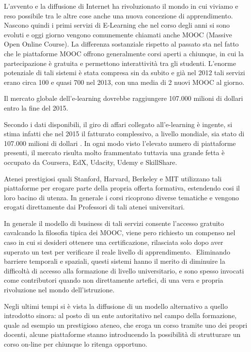 L'avvento e la diffusione di Internet ha rivoluzionato il mondo in cui viviamo e reso possibile tra le altre cose anche una nuova concezione di apprendimento. Nascono quindi i primi servizi di E-Learning che nel corso degli anni si sono evoluti e oggi giorno vengono comunemente chiamati anche MOOC (Massive Open Online Course).
​
La differenza sostanziale rispetto al passato sta nel fatto che le piattaforme MOOC offrono generalmente corsi aperti a chiunque, in cui la partecipazione è gratuita e permettono interattività tra gli studenti.
​
L'enorme potenziale di tali sistemi è stata compresa sin da subito e già nel 2012 tali servizi erano circa 100 e quasi 700 nel 2013, con una media di 2 nuovi MOOC al giorno.


Il mercato globale dell'e-learning dovrebbe raggiungere 107.000 milioni di dollari entro la fine del 2015.

Secondo i dati disponibili, il giro di affari collegato all'e-learning è ingente, si stima infatti che nel 2015 il fatturato complessivo, a livello mondiale, sia stato di 107.000 milioni di dollari \cite{teleskill}. In ogni modo visto l'elevato numero di piattaforme presenti, il mercato risulta molto frammentato tuttavia una grande fetta è occupato da Coursera, EdX, Udacity, Udemy e SkillShare.

Atenei prestigiosi quali Stanford, Harvard, Berkeley e MIT utilizzano tali piattaforme per erogare parte della propria offerta formativa, estendendo cosi il loro bacino di utenza.
In generale i corsi ricoprono diverse tematiche e vengono erogati direttamente dai Professori di tali atenei universitari.

In generale il modello di business di tali servizi consente l'accesso gratuito cavalcando la filosofia tipica dei MOOC, viene pero richiesto un compenso nel caso in cui si desideri ottenere una certificazione, rilasciata solo dopo aver superato un test per verificare il reale livello di apprendimento.
​
Eliminando barriere temporali e spaziali, questi sistemi hanno il merito di diminuire la difficoltà di accesso alla formazione di livello universitario, e sono spesso invocati come contributori quando non direttamente artefici, di una vera e propria rivoluzione nel mondo dell'istruzione.

Negli ultimi tempi si è vista la diffusione di un modello alternativo a quello introdotto sinora: al posto di un ente autoritativo nel campo della formazione, quale ad esempio un prestigioso ateneo, che eroga un corso tramite uno dei propri docenti, alcune piattaforme stanno introducendo la possibilità di strutturare un corso on-line per chiunque lo ritenga opportuno.

